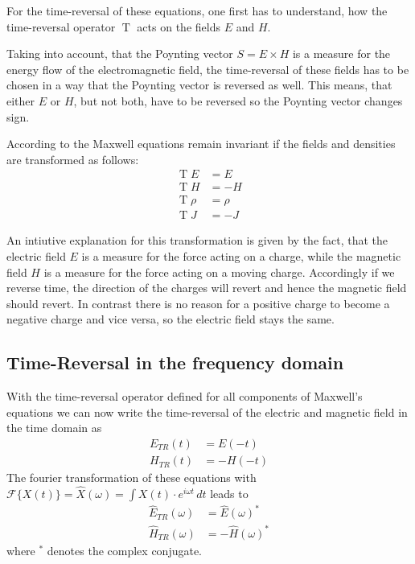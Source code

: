 For the time-reversal of these equations, one first has to understand, how the time-reversal operator \(\operatorname{T}\) acts on the fields \(E\) and \(H\).

Taking into account, that the Poynting vector \(S = E \times H\) is a measure for the energy flow of the electromagnetic field, the time-reversal of these fields has to be chosen in a way that the Poynting vector is reversed as well.
This means, that either \(E\) or \(H\), but not both, have to be reversed so the Poynting vector changes sign. 

According to \parencite{sigwarth_time_2022} the Maxwell equations remain invariant if the fields and densities are transformed as follows:
\begin{align}
    \operatorname{T}E &= E \\
    \operatorname{T}H &= -H \\
    \operatorname{T}\rho &= \rho \\
    \operatorname{T}{J} &= -{J}
\end{align}

An intiutive explanation for this transformation is given by the fact, that the electric field \(E\) is a measure for the force acting on a charge, while the magnetic field \(H\) is a measure for the force acting on a moving charge. 
Accordingly if we reverse time, the direction of the charges will revert and hence the magnetic field should revert. 
In contrast there is no reason for a positive charge to become a negative charge and vice versa, so the electric field stays the same.



\subsection{Time-Reversal in the frequency domain}
With the time-reversal operator defined for all components of Maxwell's equations we can now write the time-reversal of the electric and magnetic field in the time domain as
\begin{align}
    E_{TR}(t) &= E(-t) \\
    H_{TR}(t) &= -H(-t)
\end{align}
The fourier transformation of these equations with \(\mathcal{F}\{X(t)\} = \hat{X}(\omega) = \int X(t) \cdot e^{i\omega t} \, dt\) leads to
\begin{align}
    \hat{E}_{TR}(\omega) &= \hat{E}{(\omega)}^* \\
    \hat{H}_{TR}(\omega) &= -\hat{H}{(\omega)}^*
\end{align}
where \(^*\) denotes the complex conjugate. 

